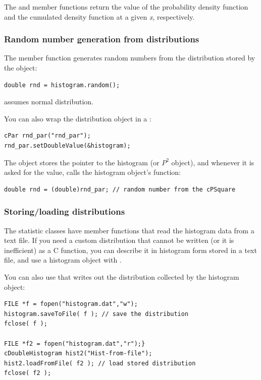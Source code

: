 The  and  member functions
return the value of the probability density function and the cumulated
density function at a given \textit{x}, respectively.


\subsubsection{Random number generation from distributions}


The  member function generates random
numbers from the distribution stored by the
object:

\begin{verbatim}
double rnd = histogram.random();
\end{verbatim}


 assumes normal distribution.

You can also wrap the distribution object in a :

\begin{verbatim}
cPar rnd_par("rnd_par");
rnd_par.setDoubleValue(&histogram);
\end{verbatim}


The  object stores the pointer to the histogram (or $P^{2}$ object),
and whenever it is asked for the value, calls the histogram object's 
function:

\begin{verbatim}
double rnd = (double)rnd_par; // random number from the cPSquare
\end{verbatim}

\subsubsection{Storing/loading distributions}


The statistic classes have  member functions
that read the histogram data from a text file. If you need a custom
distribution that cannot be written (or it
is inefficient) as a C function, you can describe it in histogram form
stored in a text file, and use a histogram object with
.

You can also use that writes out the distribution
collected by the histogram object:

\begin{verbatim}
FILE *f = fopen("histogram.dat","w");
histogram.saveToFile( f ); // save the distribution
fclose( f );

FILE *f2 = fopen("histogram.dat","r");}
cDoubleHistogram hist2("Hist-from-file");
hist2.loadFromFile( f2 ); // load stored distribution
fclose( f2 );
\end{verbatim}


